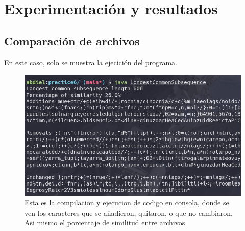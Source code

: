 \documentclass{article}
\begin{document}
\section{Experimentación y resultados}
    \subsection{Comparación de archivos}
    En este caso, solo se muestra la ejecición del programa.
    \begin{figure}[h!]
        \centering
        \includegraphics[width=1\textwidth]{p6_console_out.png}
        \caption{Esta es la compilacion y ejecucion de codigo en consola, donde se ven los caracteres que se añadieron, quitaron, o que no cambiaron. Asi mismo el porcentaje de similitud entre archivos}
        \label{fig:my_label}
    \end{figure}
    
\newpage
\end{document}
